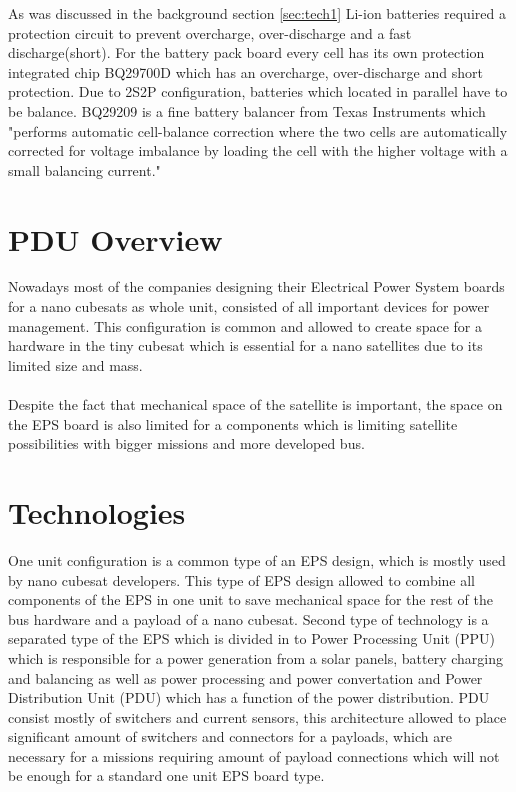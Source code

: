   As was discussed in the background section \ref{sec:tech1} Li-ion batteries required a protection circuit to prevent overcharge, over-discharge and a fast discharge(short). For the battery pack board every cell has its own protection integrated chip BQ29700D which has an overcharge, over-discharge and short protection. Due to 2S2P configuration, batteries which located in parallel have to be balance. BQ29209 is a fine battery balancer from Texas Instruments which \cite{23}"performs automatic cell-balance correction where the two cells are automatically corrected for voltage imbalance by loading the cell with the higher voltage with a small balancing current."  
  
  
  
  
  
  
  
  
  
  
  
  
  
  
  
  
  
  
  
  
  

\section{PDU Overview \label{sec:tech}}
Nowadays most of the companies designing their Electrical Power System boards for a nano cubesats as whole unit, consisted of all important devices for power management. This configuration is common and allowed to create space for a hardware in the tiny cubesat which is essential for a nano satellites due to its limited size and mass. 
\\ \\ Despite the fact that mechanical space of the satellite is important, the space on the EPS board is also limited for a components which is limiting satellite possibilities with bigger missions and more developed bus.  

\section{Technologies \label{sec:tech}}

One unit configuration is a common type of an EPS design, which is mostly used by nano cubesat developers. This type of EPS design allowed to combine all components of the EPS in one unit to save mechanical space for the rest of the bus hardware and a payload of a nano cubesat. Second type of technology is a separated type of the EPS which is divided in to Power Processing Unit (PPU) which is responsible for a power generation from a solar panels, battery charging and balancing as well as power processing and power convertation and Power Distribution Unit (PDU) which has a function of the power distribution. PDU consist mostly of switchers and current sensors, this architecture allowed to place significant amount of switchers and connectors for a payloads, which are necessary for a missions requiring amount of payload connections which will not be enough for a standard one unit EPS board type. \\
\\


